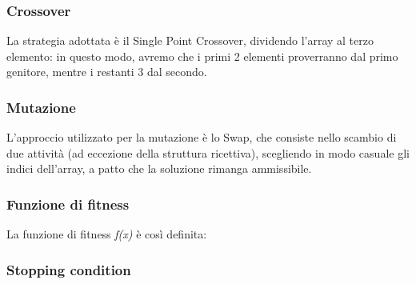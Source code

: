 \documentclass{CSUniSchoolLabReport}
\begin{document}
\subsubsection{Crossover}

La strategia adottata è il Single Point Crossover, dividendo l'array al terzo elemento: in questo modo, avremo che i primi 2 elementi proverranno dal primo genitore, mentre i restanti 3 dal secondo. 

\subsubsection{Mutazione}

L'approccio utilizzato per la mutazione è lo Swap, che consiste nello scambio di due attività (ad eccezione della struttura ricettiva), scegliendo in modo casuale gli indici dell'array, a patto che la soluzione rimanga ammissibile.

\subsubsection{Funzione di fitness}

La funzione di fitness \textit{f(x)} è così definita: \\


\subsubsection{Stopping condition}
\end{document}
